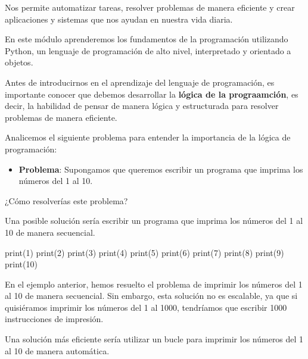 \documentclass[
  a4paper,
  DIV=11,
  numbers=noendperiod,
  onepage,
  openany]{scrreprt}
\newenvironment{Shaded}{\begin{snugshade}}{\end{snugshade}}
\newcommand{\BuiltInTok}[1]{\textcolor[rgb]{0.00,0.23,0.31}{#1}}
\newcommand{\DecValTok}[1]{\textcolor[rgb]{0.68,0.00,0.00}{#1}}
\newcommand{\NormalTok}[1]{\textcolor[rgb]{0.00,0.23,0.31}{#1}}
\providecommand{\tightlist}{%
  \setlength{\itemsep}{0pt}\setlength{\parskip}{0pt}}\usepackage{longtable,booktabs,array}
\begin{document}
Nos permite automatizar tareas, resolver problemas de manera eficiente y
crear aplicaciones y sistemas que nos ayudan en nuestra vida diaria.

En este módulo aprenderemos los fundamentos de la programación
utilizando Python, un lenguaje de programación de alto nivel,
interpretado y orientado a objetos.

Antes de introducirnos en el aprendizaje del lenguaje de programación,
es importante conocer que debemos desarrollar la \textbf{lógica de la
prograamción}, es decir, la habilidad de pensar de manera lógica y
estructurada para resolver problemas de manera eficiente.

Analicemos el siguiente problema para entender la importancia de la
lógica de programación:

\begin{itemize}
\tightlist
\item
  \textbf{Problema}: Supongamos que queremos escribir un programa que
  imprima los números del 1 al 10.
\end{itemize}

¿Cómo resolverías este problema?

Una posible solución sería escribir un programa que imprima los números
del 1 al 10 de manera secuencial.

\begin{Shaded}
\begin{Highlighting}[]
\BuiltInTok{print}\NormalTok{(}\DecValTok{1}\NormalTok{)}
\BuiltInTok{print}\NormalTok{(}\DecValTok{2}\NormalTok{)}
\BuiltInTok{print}\NormalTok{(}\DecValTok{3}\NormalTok{)}
\BuiltInTok{print}\NormalTok{(}\DecValTok{4}\NormalTok{)}
\BuiltInTok{print}\NormalTok{(}\DecValTok{5}\NormalTok{)}
\BuiltInTok{print}\NormalTok{(}\DecValTok{6}\NormalTok{)}
\BuiltInTok{print}\NormalTok{(}\DecValTok{7}\NormalTok{)}
\BuiltInTok{print}\NormalTok{(}\DecValTok{8}\NormalTok{)}
\BuiltInTok{print}\NormalTok{(}\DecValTok{9}\NormalTok{)}
\BuiltInTok{print}\NormalTok{(}\DecValTok{10}\NormalTok{)}
\end{Highlighting}
\end{Shaded}

En el ejemplo anterior, hemos resuelto el problema de imprimir los
números del 1 al 10 de manera secuencial. Sin embargo, esta solución no
es escalable, ya que si quisiéramos imprimir los números del 1 al 1000,
tendríamos que escribir 1000 instrucciones de impresión.

Una solución más eficiente sería utilizar un bucle para imprimir los
números del 1 al 10 de manera automática.
\end{document}
